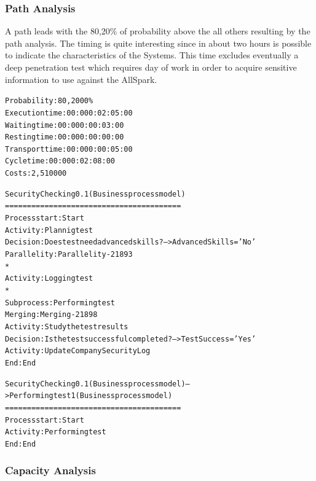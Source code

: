 \subsubsection{Path Analysis}
A path leads with the 80,20\% of probability above the all others resulting by the path analysis. The timing is quite interesting since in about two hours is possible to indicate the characteristics of the Systems. This time excludes eventually a deep penetration test which requires day of work in order to acquire sensitive information to use against the AllSpark.

\begin{alltt}
Probability:   80,2000\%
Execution time:  00:000:02:05:00
Waiting time:  00:000:00:03:00
Resting time:  00:000:00:00:00
Transport time:  00:000:00:05:00
Cycle time:  00:000:02:08:00
Costs:  2,510000

Security Checking 0.1 (Business process model)
========================================
Process start: Start
Activity: Plannig test
Decision: Does test need advanced skills? --> AdvancedSkills='No'
Parallelity: Parallelity-21893
    *
    Activity: Logging test
    *
    Subprocess: Performing test
Merging: Merging-21898
Activity: Study the test results
Decision: Is the test successful completed? --> TestSuccess='Yes'
Activity: Update Company Security Log
End: End

Security Checking 0.1 (Business process model) --> Performing test 1 (Business process model)
========================================
Process start: Start
Activity: Performing test
End: End
\end{alltt}


\subsubsection{Capacity Analysis}


